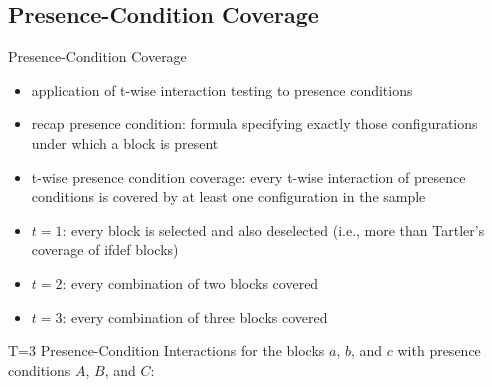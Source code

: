 \subsection{Presence-Condition Coverage}
\begin{frame}{\myframetitle{} }
	\begin{mycolumns}[widths={48}]
		\begin{definition}{Presence-Condition Coverage\mysource{\krieterpresenceconditioncoverage}}
			\begin{itemize}
				\item application of t-wise interaction testing to presence conditions
				\item recap presence condition: formula specifying exactly those configurations under which a block is present
				\item t-wise presence condition coverage: every t-wise interaction of presence conditions is covered by at least one configuration in the sample
				\item $t=1$: every block is selected and also deselected (i.e., more than Tartler's coverage of ifdef blocks)
				\item $t=2$: every combination of two blocks covered
				\item $t=3$: every combination of three blocks covered
			\end{itemize}
		\end{definition}
	\mynextcolumn
		\pause
		\begin{example}{{T=3 Presence-Condition Interactions}}
			for the blocks $a$, $b$, and $c$ with presence conditions $A$, $B$, and $C$:


\end{example}
\end{mycolumns}
\end{frame}
